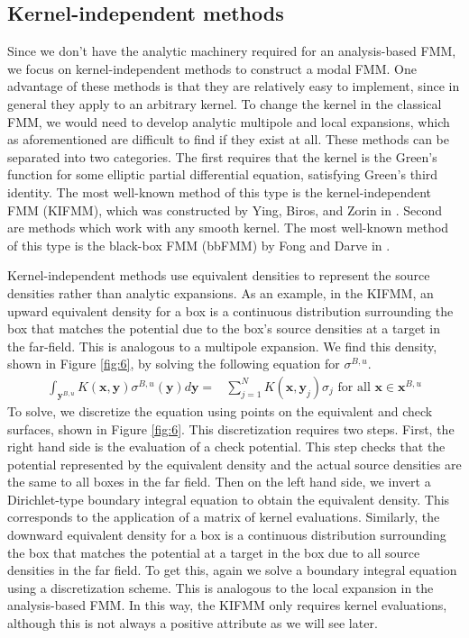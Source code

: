 \documentclass[11pt, oneside]{article}   	%
\begin{document}
\subsection{Kernel-independent methods}
Since we don't have the analytic machinery required for an analysis-based FMM, we focus on kernel-independent methods to construct a modal FMM. One advantage of these methods is that they are relatively easy to implement, since in general they apply to an arbitrary kernel. To change the kernel in the classical FMM, we would need to develop analytic multipole and local expansions, which as aforementioned are difficult to find if they exist at all. These methods can be separated into two categories. The first requires that the kernel is the Green's function for some elliptic partial differential equation, satisfying Green's third identity. The most well-known method of this type is the kernel-independent FMM (KIFMM), which was constructed by Ying, Biros, and Zorin in \cite{YBZ}. Second are methods which work with any smooth kernel. The most well-known method of this type is the black-box FMM (bbFMM) by Fong and Darve in \cite{FD}.

Kernel-independent methods use equivalent densities to represent the source densities rather than analytic expansions. As an example, in the KIFMM, an upward equivalent density for a box is a continuous distribution surrounding the box that matches the potential due to the box's source densities at a target in the far-field. This is analogous to a multipole expansion. We find this density, shown in Figure \ref{fig:6}, by solving the following equation for $\sigma^{B,u}$.
\begin{align}
\int_{\mathbf{y}^{B,u}}{K(\mathbf{x},\mathbf{y})}\sigma^{B,u}{(\mathbf{y})}d\mathbf{y}=&\sum\limits_{j=1}^N K(\mathbf{x},\mathbf{y}_j)\sigma_j\mbox{ for all }\mathbf{x}\in\mathbf{x}^{B,u}
\end{align}
To solve, we discretize the equation using points on the equivalent and check surfaces, shown in Figure \ref{fig:6}. This discretization requires two steps. First, the right hand side is the evaluation of a check potential. This step checks that the potential represented by the equivalent density and the actual source densities are the same to all boxes in the far field. Then on the left hand side, we invert a Dirichlet-type boundary integral equation to obtain the equivalent density. This corresponds to the application of a matrix of kernel evaluations. Similarly, the downward equivalent density for a box is a continuous distribution surrounding the box that matches the potential at a target in the box due to all source densities in the far field. To get this, again we solve a boundary integral equation using a discretization scheme. This is analogous to the local expansion in the analysis-based FMM. In this way, the KIFMM only requires kernel evaluations, although this is not always a positive attribute as we will see later.
\end{document}
